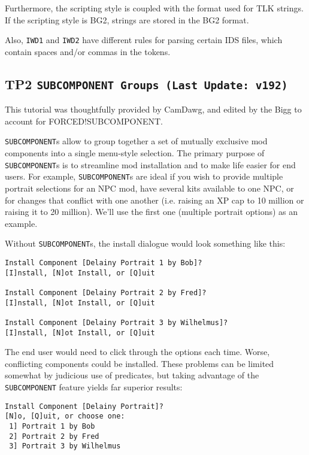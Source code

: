 \documentclass{article}
\def\t#1{{\tt #1}}
\begin{document}
Furthermore, the scripting style is coupled with the format used for TLK strings. If
the scripting style is BG2, strings are stored in the BG2 format.

Also, \t{IWD1} and \t{IWD2} have different rules for parsing certain IDS files,
which contain spaces and/or commas in the tokens.

\label{sec-subcomponent}\subsection{TP2 \tt{SUBCOMPONENT} Groups (Last Update: v192)}

This tutorial was thoughtfully provided by CamDawg, and edited by the Bigg
to account for FORCED!SUBCOMPONENT.

\t{SUBCOMPONENT}s allow to group together a set of mutually exclusive mod
components into a single menu-style selection. The primary purpose of
\t{SUBCOMPONENT}s is to streamline mod installation and to make life easier for
end users. For example, \t{SUBCOMPONENT}s are ideal if you wish to provide
multiple portrait selections for an NPC mod, have several kits available to
one NPC, or for changes that conflict with one another (i.e. raising an XP
cap to 10 million or raising it to 20 million). We'll use the first
one (multiple portrait options) as an example.

Without \t{SUBCOMPONENT}s, the install dialogue would look something like this:

\begin{verbatim}
Install Component [Delainy Portrait 1 by Bob]?
[I]nstall, [N]ot Install, or [Q]uit

Install Component [Delainy Portrait 2 by Fred]?
[I]nstall, [N]ot Install, or [Q]uit

Install Component [Delainy Portrait 3 by Wilhelmus]?
[I]nstall, [N]ot Install, or [Q]uit
\end{verbatim}

The end user would need to click through the options each time. Worse,
conflicting components could be installed. These problems can be limited
somewhat by judicious use of predicates, but taking advantage of the
\t{SUBCOMPONENT} feature yields far superior results:

\begin{verbatim}
Install Component [Delainy Portrait]?
[N]o, [Q]uit, or choose one:
 1] Portrait 1 by Bob
 2] Portrait 2 by Fred
 3] Portrait 3 by Wilhelmus
\end{verbatim}
\end{document}
